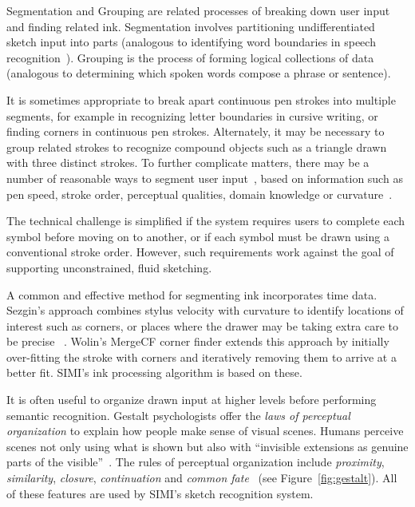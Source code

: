 Segmentation and Grouping are related processes of breaking down user
input and finding related ink. Segmentation involves partitioning
undifferentiated sketch input into parts (analogous to identifying
word boundaries in speech recognition~\cite{cole-survey}). Grouping is
the process of forming logical collections of data (analogous to
determining which spoken words compose a phrase or sentence).

It is sometimes appropriate to break apart continuous pen strokes into
multiple segments, for example in recognizing letter boundaries in
cursive writing, or finding corners in continuous pen
strokes. Alternately, it may be necessary to group related strokes to
recognize compound objects such as a triangle drawn with three
distinct strokes. To further complicate matters, there may be a number
of reasonable ways to segment user input~\cite{mankoff-burlap}, based
on information such as pen speed, stroke order, perceptual qualities,
domain knowledge or curvature~\cite{kim-segmentation}.

The technical challenge is simplified if the system requires users to
complete each symbol before moving on to another, or if each symbol
must be drawn using a conventional stroke order. However, such
requirements work against the goal of supporting unconstrained, fluid
sketching.

A common and effective method for segmenting ink incorporates time
data. Sezgin's approach combines stylus velocity with curvature to
identify locations of interest such as corners, or places where the
drawer may be taking extra care to be precise
~\cite{sezgin-early-processing,davis-siggraph-tutorial}. Wolin's
MergeCF corner finder extends this approach by initially over-fitting
the stroke with corners and iteratively removing them to arrive at a
better fit. SIMI's ink processing algorithm is based on these.

It is often useful to organize drawn input at higher levels before
performing semantic recognition.  Gestalt psychologists offer the
\textit{laws of perceptual organization} to explain how people make
sense of visual scenes. Humans perceive scenes not only using what is
shown but also with ``invisible extensions as genuine parts of the
visible''~\cite{arnheim-visthink}. The rules of perceptual
organization include \textit{proximity}, \textit{similarity},
\textit{closure}, \textit{continuation} and \textit{common
  fate}~\cite{kanizsa-gestalt} (see Figure~\ref{fig:gestalt}). All of
these features are used by SIMI's sketch recognition system.

